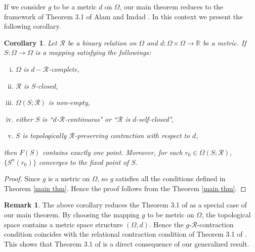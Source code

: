 \documentclass[10pt, reqno]{amsart}
\newtheorem{corollary}[theorem]{Corollary}
\theoremstyle{definition}
\newtheorem{remark}[theorem]{Remark}
\theoremstyle{remark}
\numberwithin{equation}{section}
\begin{document}

If we consider $g$ to be a metric $d$ on $\Omega$, our main theorem reduces to the framework of Theorem 3.1 of Alam and  Imdad \cite{alam2015relation}. In this context we present the following corollary.

\begin{corollary}
      Let  $\mathcal{R}$ be a binary relation on $ \Omega $ and $ d : \Omega \times \Omega \to \mathbb{R} $  be a   metric.    If $ S : \Omega \to \Omega $ is a mapping satisfying the followings:
	\begin{enumerate}[(i)]
		\item $ \Omega $ is $d-\mathcal{R}$-complete,
		\item $\mathcal{R}$ is $ S $-closed,
		\item $ \Omega ( S; \mathcal{R} ) $ is non-empty,
		\item either $ S $ is ``$d$-$\mathcal{R}$-continuous" or ``$\mathcal{R}$ is $d$-self-closed",
		\item $ S $ is topologically $\mathcal{R}$-preserving contraction with respect to $d$,  
	\end{enumerate} 
	then $ F ( S ) $ contains exactly one point. Moreover, for each $r_0\in \Omega ( S; \mathcal{R})$,   $ \{ S^n(r_0) \} $ converges to the fixed point of $S$. 
\end{corollary}
\begin{proof}
    Since $ g $ is a   metric  on $ \Omega $, so $g $ satisfies all the conditions defined in Theorem \ref{main thm}. Hence the proof follows from the  Theorem \ref{main thm}.
\end{proof}

 \begin{remark}
     The above corollary reduces the Theorem  3.1 of \cite{alam2015relation}   as a special case of our main theorem. By choosing the mapping $ g $ to be metric on $\Omega $, the topological space contains a metric space  structure $ ( \Omega, d ) $. Hence the $ g$-$ \mathcal{R}$-contraction condition coincides with the relational contraction condition of Theorem  3.1 of \cite{alam2015relation}. This shows  that Theorem 3.1 of \cite{alam2015relation} is a direct consequence of our generalized result.
 \end{remark}
\end{document}
